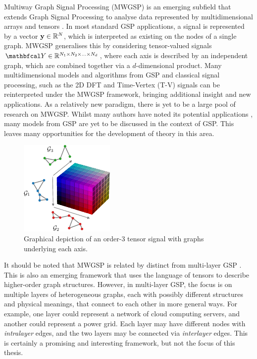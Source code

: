 Multiway Graph Signal Processing (MWGSP) is an emerging subfield that extends Graph Signal Processing to analyse data represented by multidimensional arrays and tensors \citep{Stanley2020}. In most standard GSP applications, a signal is represented by a vector $\mathbf{y} \in \mathbb{R}^N$, which is interpreted as existing on the nodes of a single graph. MWGSP generalises this by considering tensor-valued signals $\Yt \in \R^{N_1 \times N_2 \times ... \times N_d}$, where each axis is described by an independent graph, which are combined together via a $d$-dimensional product. Many multidimensional models and algorithms from GSP and classical signal processing, such as the 2D DFT and Time-Vertex (T-V) signals can be reinterpreted under the MWGSP framework, bringing additional insight and new applications. As a relatively new paradigm, there is yet to be a large pool of research on MWGSP. Whilst many authors have noted its potential applications \citep{Marques2020b,Li2023}, many models from GSP are yet to be discussed in the context of GSP. This leaves many opportunities for the development of theory in this area. 

\begin{figure}[t]
    \centering
    \includegraphics[width=0.45\linewidth]{Figures/colored_tensor.pdf}
    \caption[Graphical depiction of an order-3 tensor]{Graphical depiction of an order-3 tensor signal with graphs underlying each axis.} 
    \label{fig:coloured_tensor}
\end{figure}   

It should be noted that MWGSP is related by distinct from multi-layer GSP \citep{Zhang2023b}. This is also an emerging framework that uses the language of tensors to describe higher-order graph structures. However, in multi-layer GSP, the focus is on multiple layers of heterogeneous graphs, each with possibly different structures and physical meanings, that connect to each other in more general ways. For example, one layer could represent a network of cloud computing servers, and another could represent a power grid. Each layer may have different nodes with \textit{intralayer} edges, and the two layers may be connected via \textit{interlayer} edges. This is certainly a promising and interesting framework, but not the focus of this thesis. 

